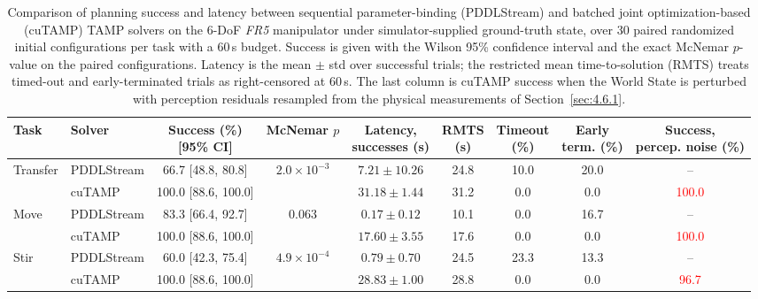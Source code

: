 \documentclass{ieeeaccess}
\newif\ifhighlight
\newcommand{\nd}[1]{\textcolor{red}{#1}}
\newcommand{\revbox}[1]{\ifhighlight\noindent\colorbox{yellow}{\parbox{\dimexpr\linewidth-2\fboxsep\relax}{#1}}\else#1\fi}
\begin{document}
\begin{table}[t]
\revbox{%
\caption{Comparison of planning success and latency between sequential parameter-binding (PDDLStream) and batched joint optimization-based (cuTAMP) TAMP solvers on the 6-DoF \textit{FR5} manipulator under simulator-supplied ground-truth state, over 30 paired randomized initial configurations per task with a 60\,s budget. Success is given with the Wilson 95\% confidence interval and the exact McNemar $p$-value on the paired configurations. Latency is the mean $\pm$ std over successful trials; the restricted mean time-to-solution (RMTS) treats timed-out and early-terminated trials as right-censored at 60\,s. The last column is cuTAMP success when the World State is perturbed with perception residuals resampled from the physical measurements of Section~\ref{sec:4.6.1}.}
\label{tab:tamp_comparison}
\centering
\footnotesize
\setlength{\tabcolsep}{3pt}
\begin{tabular*}{\linewidth}{@{\extracolsep{\fill}}llccccccc@{}}
\toprule
Task & Solver & \makecell{Success (\%)\\{}[95\% CI]} & \makecell{McNemar\\$p$} & \makecell{Latency,\\successes (s)} & \makecell{RMTS\\(s)} & \makecell{Timeout\\(\%)} & \makecell{Early\\term. (\%)} & \makecell{Success,\\percep. noise (\%)} \\
\midrule
\multirow{2}{*}{Transfer}
 & PDDLStream & 66.7 [48.8, 80.8] & \multirow{2}{*}{$2.0\times10^{-3}$} & $7.21 \pm 10.26$ & 24.8 & 10.0 & 20.0 & -- \\
 & cuTAMP     & 100.0 [88.6, 100.0] & & $31.18 \pm 1.44$ & 31.2 & 0.0  & 0.0 & \nd{100.0} \\
\midrule
\multirow{2}{*}{Move}
 & PDDLStream & 83.3 [66.4, 92.7] & \multirow{2}{*}{$0.063$} & $0.17 \pm 0.12$ & 10.1 & 0.0  & 16.7 & -- \\
 & cuTAMP     & 100.0 [88.6, 100.0] & & $17.60 \pm 3.55$ & 17.6 & 0.0 & 0.0 & \nd{100.0} \\
\midrule
\multirow{2}{*}{Stir}
 & PDDLStream & 60.0 [42.3, 75.4] & \multirow{2}{*}{$4.9\times10^{-4}$} & $0.79 \pm 0.70$ & 24.5 & 23.3 & 13.3 & -- \\
 & cuTAMP     & 100.0 [88.6, 100.0] & & $28.83 \pm 1.00$ & 28.8 & 0.0 & 0.0 & \nd{96.7} \\
\bottomrule
\end{tabular*}}
\end{table}
\end{document}
